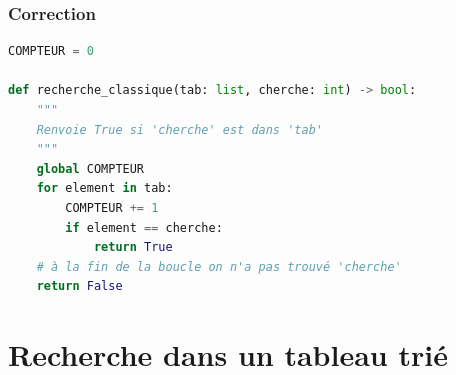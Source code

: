 \documentclass[svgnames,11pt]{beamer}
\begin{document}
\begin{frame}[fragile]
    \frametitle{Correction}

\begin{center}
\begin{lstlisting}[language=Python , basicstyle=\small, xleftmargin=2em, xrightmargin=2em]
COMPTEUR = 0

def recherche_classique(tab: list, cherche: int) -> bool:
    """
    Renvoie True si 'cherche' est dans 'tab'
    """
    global COMPTEUR
    for element in tab:
        COMPTEUR += 1
        if element == cherche:
            return True
    # à la fin de la boucle on n'a pas trouvé 'cherche'
    return False
\end{lstlisting}
\end{center}
\end{frame}
\section{Recherche dans un tableau trié}
\end{document}
